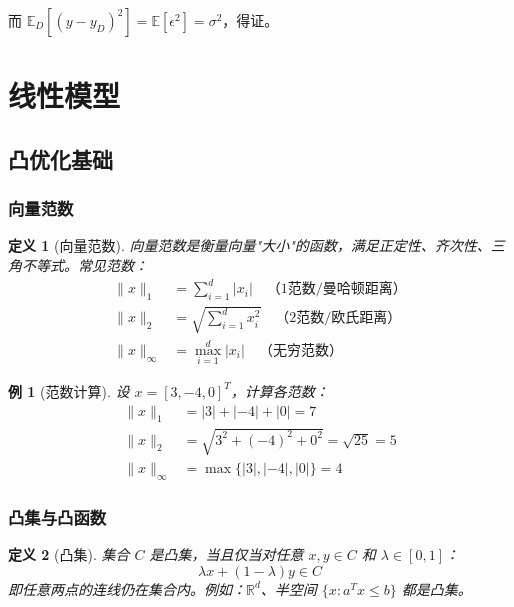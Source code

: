 \documentclass[12pt,a4paper]{ctexart}
\newtheorem{definition}{定义}[section]
\newtheorem{example}{例}[section]
\begin{document}
而 $\mathbb{E}_D[(y - y_D)^2] = \mathbb{E}[\epsilon^2] = \sigma^2$，得证。


\section{线性模型}

\subsection{凸优化基础}

\subsubsection{向量范数}

\begin{definition}[向量范数]
向量范数是衡量向量"大小"的函数，满足正定性、齐次性、三角不等式。常见范数：
\begin{align}
\|x\|_1 &= \sum_{i=1}^{d}|x_i| \quad \text{（1范数/曼哈顿距离）} \\
\|x\|_2 &= \sqrt{\sum_{i=1}^{d}x_i^2} \quad \text{（2范数/欧氏距离）} \\
\|x\|_\infty &= \max_{i=1}^{d}|x_i| \quad \text{（无穷范数）}
\end{align}
\end{definition}

\begin{example}[范数计算]
设 $x = [3, -4, 0]^T$，计算各范数：
\begin{align*}
\|x\|_1 &= |3| + |-4| + |0| = 7 \\
\|x\|_2 &= \sqrt{3^2 + (-4)^2 + 0^2} = \sqrt{25} = 5 \\
\|x\|_\infty &= \max\{|3|, |-4|, |0|\} = 4
\end{align*}
\end{example}

\subsubsection{凸集与凸函数}

\begin{definition}[凸集]
集合 $C$ 是凸集，当且仅当对任意 $x, y \in C$ 和 $\lambda \in [0,1]$：
\[
\lambda x + (1-\lambda)y \in C
\]
即任意两点的连线仍在集合内。例如：$\mathbb{R}^d$、半空间 $\{x: a^Tx \leq b\}$ 都是凸集。
\end{definition}
\end{document}
